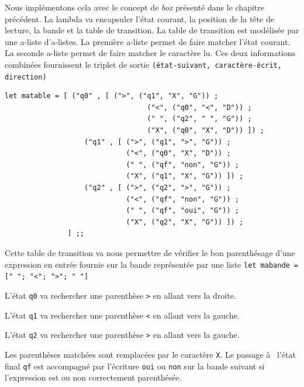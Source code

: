 Nous implémentons cela avec le concept de \textit{box} présenté dans le chapitre
précédent. La lambda va encapsuler l'état courant, la position de la tête de
lecture, la bande et la table de transition.
La table de transition est modélisée par une a-liste d'a-listes.
La première a-liste permet de faire matcher l'état courant.
La seconde a-liste permet de faire matcher le caractère lu.
Ces deux informations combinées fournissent  le triplet de sortie
\texttt{(état-suivant, caractère-écrit, direction)}

\begin{Verbatim}
let matable = [ ("q0" , [ (">", ("q1", "X", "G")) ;
								  ("<", ("q0", "<", "D")) ; 
								  (" ", ("q2", " ", "G")) ;
								  ("X", ("q0", "X",	"D")) ]) ;
			       ("q1" , [ (">", ("q1", ">", "G")) ;
			                 ("<", ("q0", "X", "D")) ;
			                 (" ", ("qf", "non", "G")) ;
			                 ("X", ("q1", "X", "G")) ]) ;
			       ("q2" , [ (">", ("q2", ">", "G")) ;
			                 ("<", ("qf", "non", "G")) ;
			                 (" ", ("qf", "oui", "G")) ;
			                 ("X", ("q2", "X", "G")) ]) ;
			   ] ;;
\end{Verbatim}

Cette table de transition va nous permettre de vérifier le bon parenthésage
d'une expression en entrée fournie sur la bande représentée par une liste 
\texttt{let mabande =   [" "; "<"; ">"; " "]}

L'état \texttt{q0} va rechercher une parenthèse \texttt{>} en allant vers la droite.

L'état \texttt{q1} va rechercher une parenthèse \texttt{<} en allant vers la gauche.

L'état \texttt{q2} va rechercher une parenthèse \texttt{>} en allant vers la gauche.


Les parenthèses matchées sont remplacées par le caractère \texttt{X}.
Le passage à  l'état final \texttt{qf} est accompagné par l'écriture \texttt{oui} ou
\texttt{non} sur la bande suivant si l'expression est ou non correctement parenthésée.

